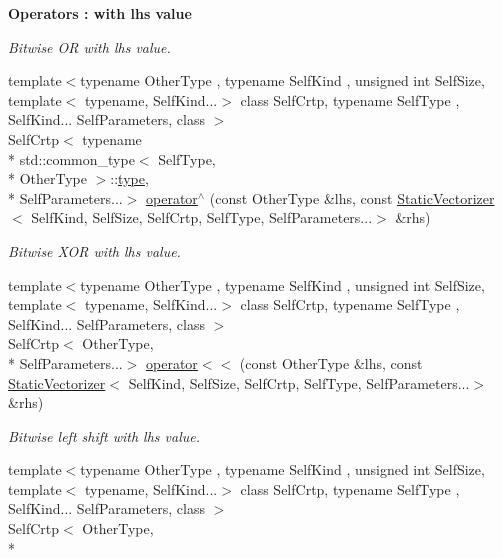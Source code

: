 \begin{Indent}{\bf Operators \-: with lhs value}
\begin{DoxyCompactItemize}
\begin{DoxyCompactList}\small\item\em Bitwise O\-R with lhs value. \end{DoxyCompactList}\item 
{\footnotesize template$<$typename Other\-Type , typename Self\-Kind , unsigned int Self\-Size, template$<$ typename, Self\-Kind...$>$ class Self\-Crtp, typename Self\-Type , Self\-Kind... Self\-Parameters, class $>$ }\\Self\-Crtp$<$ typename \\*
std\-::common\-\_\-type$<$ Self\-Type, \\*
Other\-Type $>$\-::\hyperlink{classmagrathea_1_1StaticVectorizer_a28c393a3896a3e839008c35d56b10a54}{type}, \\*
Self\-Parameters...$>$ \hyperlink{classmagrathea_1_1StaticVectorizer_a00a22c5599a1abe3672de5342dd8bef0}{operator$^\wedge$} (const Other\-Type \&lhs, const \hyperlink{classmagrathea_1_1StaticVectorizer}{Static\-Vectorizer}$<$ Self\-Kind, Self\-Size, Self\-Crtp, Self\-Type, Self\-Parameters...$>$ \&rhs)
\begin{DoxyCompactList}\small\item\em Bitwise X\-O\-R with lhs value. \end{DoxyCompactList}\item 
{\footnotesize template$<$typename Other\-Type , typename Self\-Kind , unsigned int Self\-Size, template$<$ typename, Self\-Kind...$>$ class Self\-Crtp, typename Self\-Type , Self\-Kind... Self\-Parameters, class $>$ }\\Self\-Crtp$<$ Other\-Type, \\*
Self\-Parameters...$>$ \hyperlink{classmagrathea_1_1StaticVectorizer_a6962dd6aa68898e5b0656c7d1db54efd}{operator$<$$<$} (const Other\-Type \&lhs, const \hyperlink{classmagrathea_1_1StaticVectorizer}{Static\-Vectorizer}$<$ Self\-Kind, Self\-Size, Self\-Crtp, Self\-Type, Self\-Parameters...$>$ \&rhs)
\begin{DoxyCompactList}\small\item\em Bitwise left shift with lhs value. \end{DoxyCompactList}\item 
{\footnotesize template$<$typename Other\-Type , typename Self\-Kind , unsigned int Self\-Size, template$<$ typename, Self\-Kind...$>$ class Self\-Crtp, typename Self\-Type , Self\-Kind... Self\-Parameters, class $>$ }\\Self\-Crtp$<$ Other\-Type, \\*

\end{DoxyCompactItemize}
\end{Indent}

